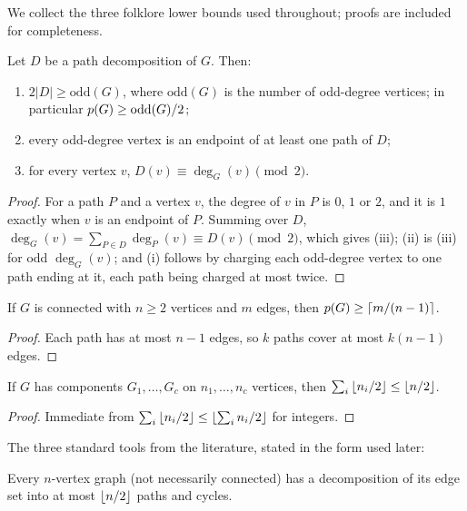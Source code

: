 We collect the three folklore lower bounds used throughout; proofs are included for
completeness.

\begin{lemma}\label{int:lem-LB1}
Let $D$ be a path decomposition of $G$. Then:
\begin{enumerate}[label=(\roman*),leftmargin=2em]
\item $2|D|\ge \mathrm{odd}(G)$, where $\mathrm{odd}(G)$ is the number of odd-degree
vertices; in particular $p(G)\ge \mathrm{odd}(G)/2$;
\item every odd-degree vertex is an endpoint of at least one path of $D$;
\item for every vertex $v$, $D(v)\equiv \deg_G(v)\pmod 2$.
\end{enumerate}
\end{lemma}

\begin{proof}
For a path $P$ and a vertex $v$, the degree of $v$ in $P$ is $0$, $1$ or $2$, and it is $1$
exactly when $v$ is an endpoint of $P$. Summing over $D$,
$\deg_G(v)=\sum_{P\in D}\deg_P(v)\equiv D(v)\pmod 2$, which gives (iii); (ii) is (iii) for
odd $\deg_G(v)$; and (i) follows by charging each odd-degree vertex to one path ending at
it, each path being charged at most twice.
\end{proof}

\begin{lemma}\label{int:lem-LB2}
If $G$ is connected with $n\ge2$ vertices and $m$ edges, then
$p(G)\ge \left\lceil m/(n-1) \right\rceil$.
\end{lemma}

\begin{proof}
Each path has at most $n-1$ edges, so $k$ paths cover at most $k(n-1)$ edges.
\end{proof}

\begin{lemma}\label{int:lem-sum}
If $G$ has components $G_1,\dots,G_c$ on $n_1,\dots,n_c$ vertices, then
$\sum_i \left\lfloor n_i/2 \right\rfloor\le \left\lfloor n/2 \right\rfloor$.
\end{lemma}

\begin{proof}
Immediate from $\sum_i \left\lfloor n_i/2 \right\rfloor\le \left\lfloor \sum_i n_i /2 \right\rfloor$ for integers.
\end{proof}

The three standard tools from the literature, stated in the form used later:

\begin{theorem}\label{int:thm-lovasz}
Every $n$-vertex graph (not necessarily connected) has a decomposition of its edge set into
at most $\left\lfloor n/2 \right\rfloor$ paths and cycles.
\end{theorem}

